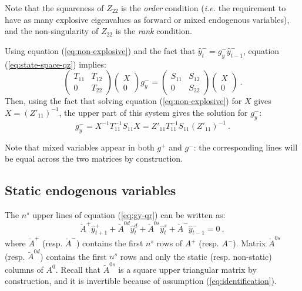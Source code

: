 \documentclass[11pt,a4paper]{article}
\begin{document}
Note that the squareness of $Z_{22}$ is the \citet{blanchard/kahn:1980}
\emph{order} condition (\textit{i.e.} the requirement to have as many explosive
eigenvalues as forward or mixed endogenous variables), and the non-singularity
of $Z_{22}$ is the \citet{blanchard/kahn:1980} \emph{rank} condition.

Using equation (\ref{eq:non-explosive}) and the fact that $\hat{y}^-_t = g^-_y
\hat{y}^-_{t-1}$, equation (\ref{eq:state-space-qz}) implies:
\begin{equation*}
  \left(
    \begin{matrix}
      T_{11} & T_{12} \\
      0 & T_{22}
    \end{matrix}
  \right)
  \left(
    \begin{matrix}
      X \\
      0
    \end{matrix}
  \right)
  g^-_y
  =
  \left(
    \begin{matrix}
      S_{11} & S_{12} \\
      0 & S_{22}
    \end{matrix}
  \right)
  \left(
    \begin{matrix}
      X \\
      0
    \end{matrix}
  \right) \: .
\end{equation*}
Then, using the fact that solving equation (\ref{eq:non-explosive}) for $X$
gives $X = (Z'_{11})^{-1}$, the upper part of this system gives the solution
for $g^-_y$:
\begin{equation*}
  g^-_y = X^{-1} T_{11}^{-1}S_{11}X = Z'_{11}T_{11}^{-1}S_{11}(Z'_{11})^{-1} \: .
\end{equation*}

Note that mixed variables appear in both $g^+$ and $g^-$: the corresponding
lines will be equal across the two matrices by construction.

\subsection{Static endogenous variables}

The $n^s$ upper lines of equation (\ref{eq:gy-qr}) can be written as:
\begin{equation}
  \label{eq:static-part}
  \breve{A}^+ \hat{y}^+_{t+1} + \breve{A}^{0d} \hat{y}^d_t + \breve{A}^{0s} \hat{y}^{s}_t + \breve{A}^- \hat{y}^-_{t-1} = 0 \: ,
\end{equation}
where $\breve{A}^+$ (resp. $\breve{A}^-$) contains the first $n^s$ rows of
$A^+$ (resp. $A^-$). Matrix $\breve{A}^{0s}$ (resp. $\breve{A}^{0d}$) contains
the first $n^s$ rows and only the static (resp. non-static) columns of
$A^0$. Recall that $\breve{A}^{0s}$ is a square upper triangular matrix by
construction, and it is invertible because of assumption
(\ref{eq:identification}).
\end{document}
